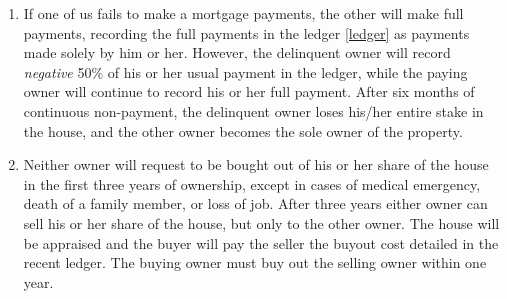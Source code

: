 \documentclass[12pt]{article}
\begin{document}
\begin{enumerate}
\item If one of us fails to make a mortgage payments, the other will 
make full payments, recording the full 
payments in the ledger \autoref{ledger}
as payments made solely by him or her.
However, the delinquent owner will record {\em negative} 50\% 
of his or her usual payment in the ledger, while the paying owner
will continue to record his or her full payment. After six months of continuous non-payment, the delinquent owner loses his/her entire stake in the house, and the other owner becomes the sole owner of the property.

\item Neither owner will request to be bought out of his or her share of the house in the 
first three years of ownership, except in cases of medical emergency, 
death of a family member, or loss of job. After three years either 
owner can sell his or her share of the house, but only
to the other owner. The house will be appraised and the 
buyer will pay the seller the buyout cost detailed in the recent ledger. The buying owner must buy out the selling owner within one year.



\end{enumerate}
\end{document}
